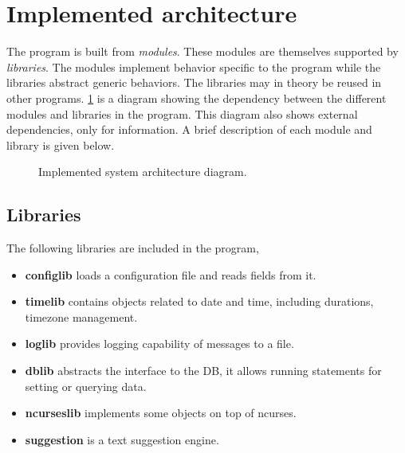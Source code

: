 \section{Implemented architecture}
The program is built from \emph{modules}. These modules are themselves supported
by \emph{libraries}. The modules implement behavior specific to the program
while the libraries abstract generic behaviors. The libraries may in theory be
reused in other programs. \cref{fig:arch_modules} is a diagram showing the
dependency between the different modules and libraries in the program. This
diagram also shows external dependencies, only for information. A brief
description of each module and library is given below.

\begin{figure}
  
  \caption{\label{fig:arch_modules} Implemented system architecture diagram.}
\end{figure}

\subsection{Libraries}
The following libraries are included in the program,
\begin{itemize}
\item \textbf{config\textunderscore lib} loads a configuration file and reads fields
  from it.
\item \textbf{time\textunderscore lib} contains objects related to date and
  time, including durations, timezone management.
\item \textbf{log\textunderscore lib} provides logging capability of messages to
  a file.
\item \textbf{db\textunderscore lib} abstracts the interface to the \gls{DB}, it
  allows running statements for setting or querying data.
\item \textbf{ncurses\textunderscore lib} implements some objects on top
  of ncurses.
\item \textbf{suggestion} is a text suggestion engine.
\end{itemize}

